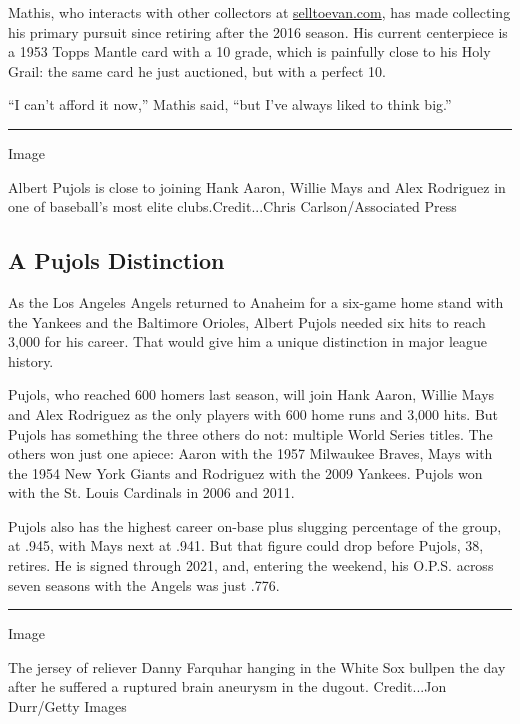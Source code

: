 Mathis, who interacts with other collectors at
\href{http://selltoevan.com/}{selltoevan.com}, has made collecting his
primary pursuit since retiring after the 2016 season. His current
centerpiece is a 1953 Topps Mantle card with a 10 grade, which is
painfully close to his Holy Grail: the same card he just auctioned, but
with a perfect 10.

``I can't afford it now,'' Mathis said, ``but I've always liked to think
big.''

\begin{center}\rule{0.5\linewidth}{\linethickness}\end{center}

Image

Albert Pujols is close to joining Hank Aaron, Willie Mays and Alex
Rodriguez in one of baseball's most elite clubs.Credit...Chris
Carlson/Associated Press

\hypertarget{a-pujols-distinction}{%
\subsection{A Pujols Distinction}\label{a-pujols-distinction}}

As the Los Angeles Angels returned to Anaheim for a six-game home stand
with the Yankees and the Baltimore Orioles, Albert Pujols needed six
hits to reach 3,000 for his career. That would give him a unique
distinction in major league history.

Pujols, who reached 600 homers last season, will join Hank Aaron, Willie
Mays and Alex Rodriguez as the only players with 600 home runs and 3,000
hits. But Pujols has something the three others do not: multiple World
Series titles. The others won just one apiece: Aaron with the 1957
Milwaukee Braves, Mays with the 1954 New York Giants and Rodriguez with
the 2009 Yankees. Pujols won with the St. Louis Cardinals in 2006 and
2011.

Pujols also has the highest career on-base plus slugging percentage of
the group, at .945, with Mays next at .941. But that figure could drop
before Pujols, 38, retires. He is signed through 2021, and, entering the
weekend, his O.P.S. across seven seasons with the Angels was just .776.

\begin{center}\rule{0.5\linewidth}{\linethickness}\end{center}

Image

The jersey of reliever Danny Farquhar hanging in the White Sox bullpen
the day after he suffered a ruptured brain aneurysm in the dugout.
Credit...Jon Durr/Getty Images

